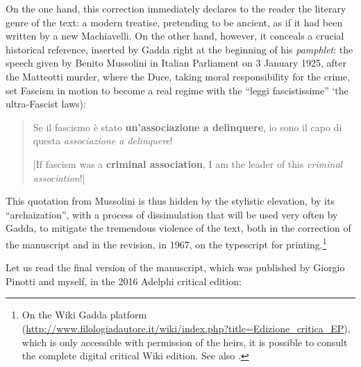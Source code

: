 \documentclass{article}
\begin{document}
On the one hand, this correction immediately declares to the reader the
literary genre of the text: a modern treatise, pretending to be ancient,
as if it had been written by a new Machiavelli. On the other hand,
however, it conceals a crucial historical reference, inserted by Gadda
right at the beginning of his \emph{pamphlet}: the speech given by
Benito Mussolini in Italian Parliament on 3 January 1925, after the
Matteotti murder, where the Duce, taking moral responsibility for the
crime, set Fascism in motion to become a real regime with the ``leggi fascistissime''
`the ultra-Fascist laws):

\begin{quote}
    
Se il fascismo è stato \textbf{un'associazione a delinquere}, io sono il
capo di questa \emph{associazione a delinquere}!

\vspace{1em}

[If fascism was a \textbf{criminal association}, I am the leader of this \emph{criminal association}!]
\begin{flushright}
\parencite[13--14]{mussolini_discorsi_1926}
\end{flushright}
\end{quote}

\noindent This quotation from Mussolini is thus hidden by the stylistic elevation, by
its ``archaization'', with a process of dissimulation that will be used
very often by Gadda, to mitigate the tremendous violence of the text,
both in the correction of the manuscript and in the revision, in 1967,
on the typescript for printing.\footnote{On the Wiki Gadda platform
  (\url{http://www.filologiadautore.it/wiki/index.php?title=Edizione\_critica\_EP}), which is only accessible with permission of the heirs, it is possible to consult the complete digital critical Wiki edition. See also \cite{giuffrida_edizione_2016}.}

Let us read the final version of the manuscript, which was published by Giorgio Pinotti and myself, in the 2016 Adelphi critical edition:
\end{document}
